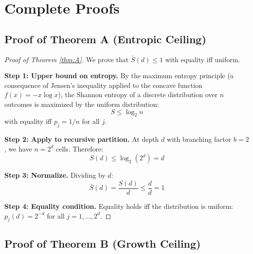 \documentclass[11pt,a4paper]{article}
\theoremstyle{definition}
\theoremstyle{remark}
\newcommand{\Sbar}{\bar{S}}
\begin{document}
\section{Complete Proofs}
\label{sec:proofs}

\subsection{Proof of Theorem A (Entropic Ceiling)}

\begin{proof}[Proof of Theorem \ref{thm:A}]
We prove that $\Sbar(d) \leq 1$ with equality iff uniform.

\textbf{Step 1: Upper bound on entropy.}
By the maximum entropy principle (a consequence of Jensen's inequality applied to the concave function $f(x) = -x \log x$), the Shannon entropy of a discrete distribution over $n$ outcomes is maximized by the uniform distribution:
\begin{equation}
    S \leq \log_2 n
\end{equation}
with equality iff $p_j = 1/n$ for all $j$.

\textbf{Step 2: Apply to recursive partition.}
At depth $d$ with branching factor $b = 2$, we have $n = 2^d$ cells. Therefore:
\begin{equation}
    S(d) \leq \log_2(2^d) = d
\end{equation}

\textbf{Step 3: Normalize.}
Dividing by $d$:
\begin{equation}
    \Sbar(d) = \frac{S(d)}{d} \leq \frac{d}{d} = 1
\end{equation}

\textbf{Step 4: Equality condition.}
Equality holds iff the distribution is uniform: $p_j(d) = 2^{-d}$ for all $j = 1, \ldots, 2^d$.
\end{proof}

\subsection{Proof of Theorem B (Growth Ceiling)}
\end{document}
